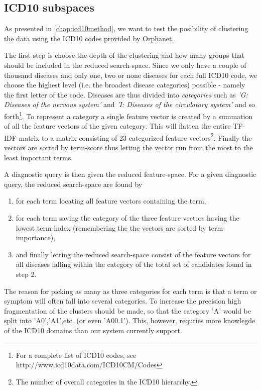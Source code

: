 \documentclass[10pt,letterpaper,final]{article}
\begin{document}

\subsection{ICD10 subspaces}
As presented in \ref{chap:icd10method}, we want to test the posibility of clustering
the data using the ICD10 codes provided by Orphanet. 


The first step is choose the depth of the clustering and how many groups that should
be included in the reduced search-space. Since we only have a couple of thousand 
diseases and only one, two or none diseases for each full ICD10 code, we choose the
highest level (i.e. the broadest disease categories) possible - namely the first letter
of the code. Diseases are thus divided into \textit{categories} such as \textit{'G: Diseases of the nervous system'}
and \textit{'I: Diseases of the circulatory system'} and so forth\footnote{For a complete list of ICD10 codes, see http://www.icd10data.com/ICD10CM/Codes}. To represent a
category a single feature vector is created by a summation of all the feature vectors of 
the given category. This will flatten the entire TF-IDF matrix to a matrix consisting
of 23 categorized feature vectors\footnote{The number of overall categories in the ICD10 hierarchy.}. 
Finally the vectors are sorted by term-score thus letting the vector run from
the most to the least important terms.

A diagnostic query is then given the reduced feature-space. For a given diagnostic query,
the reduced search-space are found by
\begin{enumerate}
    \item for each term locating all feature vectors containing the term,
    \item for each term saving the category of the three feature vectors having the lowest term-index (remembering the the vectors are sorted by term-importance),
    \item and finally letting the reduced search-space consist of the feature vectors for all diseases falling within the category of the total set of candidates found in step 2.
\end{enumerate}
The reason for picking as many as three categories for each term is that a term or symptom will often fall into several categories. To increase the precision high fragmentation of the clusters should be made, so that the category 'A' would be split into 'A0','A1',etc. (or even 'A00.1'). This, however, requries more knowlegde of the ICD10 domains than our system currently support. 
\end{document}
